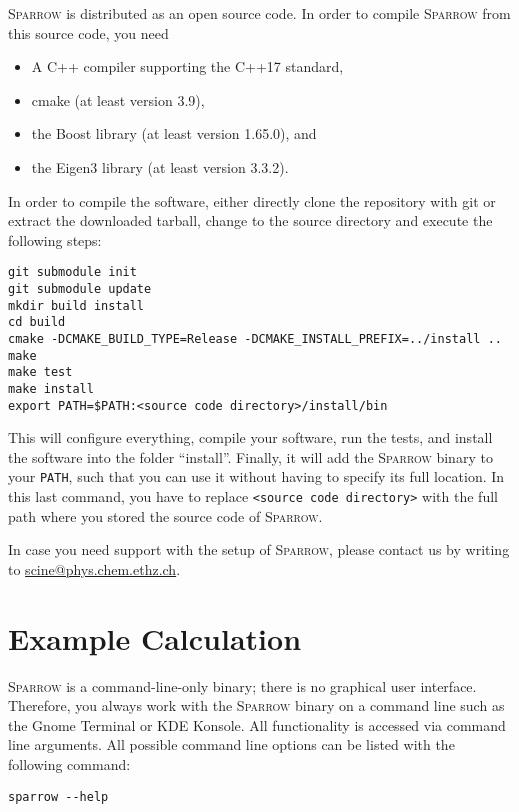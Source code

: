 \documentclass[]{tufte-book}
\begin{document}
\textsc{Sparrow} is distributed as an open source code. In order to compile \textsc{Sparrow} from this source code, you need
\begin{itemize}
 \item A C++ compiler supporting the C++17 standard,
 \item cmake (at least version 3.9),
 \item the Boost library (at least version 1.65.0), and
 \item the Eigen3 library (at least version 3.3.2).
\end{itemize}
In order to compile the software, either directly clone the repository with git or extract the downloaded tarball, change
to the source directory and execute the following steps:
\begin{verbatim}
git submodule init
git submodule update
mkdir build install
cd build
cmake -DCMAKE_BUILD_TYPE=Release -DCMAKE_INSTALL_PREFIX=../install ..
make
make test
make install
export PATH=$PATH:<source code directory>/install/bin
\end{verbatim}
This will configure everything, compile your software, run the tests, and install the software
into the folder ``install''. Finally, it will add the \textsc{Sparrow} binary to your \texttt{PATH}, such that you can use
it without having to specify its full location. In this last command, you have to replace \texttt{<source code directory>}
with the full path where you stored the source code of \textsc{Sparrow}.

In case you need support with the setup of \textsc{Sparrow}, please contact us by writing to \href{scine@phys.chem.ethz.ch}{scine@phys.chem.ethz.ch}.



\chapter{Example Calculation}

\textsc{Sparrow} is a command-line-only binary; there is no graphical user interface. Therefore, you always work with the
\textsc{Sparrow} binary on a command line such as the Gnome Terminal or KDE Konsole.
All functionality is accessed via command line arguments. All possible command line options can be listed with the following command:
\begin{verbatim}
sparrow --help
\end{verbatim}
\end{document}
